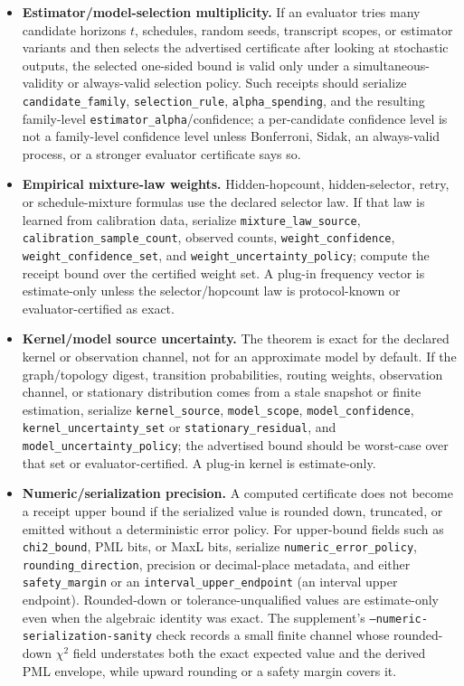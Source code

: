 \documentclass[11pt]{article}
\begin{document}
\begin{itemize}[leftmargin=1.2em]
\item \textbf{Estimator/model-selection multiplicity.} If an evaluator tries many candidate horizons $t$, schedules, random seeds, transcript scopes, or estimator variants and then selects the advertised certificate after looking at stochastic outputs, the selected one-sided bound is valid only under a simultaneous-validity or always-valid selection policy.  Such receipts should serialize \nolinkurl{candidate_family}, \nolinkurl{selection_rule}, \nolinkurl{alpha_spending}, and the resulting family-level \texttt{estimator\_alpha}/confidence; a per-candidate confidence level is not a family-level confidence level unless Bonferroni, Sidak, an always-valid process, or a stronger evaluator certificate says so.
\item \textbf{Empirical mixture-law weights.} Hidden-hopcount, hidden-selector, retry, or schedule-mixture formulas use the declared selector law.  If that law is learned from calibration data, serialize \nolinkurl{mixture_law_source}, \nolinkurl{calibration_sample_count}, observed counts, \nolinkurl{weight_confidence}, \nolinkurl{weight_confidence_set}, and \nolinkurl{weight_uncertainty_policy}; compute the receipt bound over the certified weight set.  A plug-in frequency vector is estimate-only unless the selector/hopcount law is protocol-known or evaluator-certified as exact.
\item \textbf{Kernel/model source uncertainty.} The theorem is exact for the declared kernel or observation channel, not for an approximate model by default.  If the graph/topology digest, transition probabilities, routing weights, observation channel, or stationary distribution comes from a stale snapshot or finite estimation, serialize \nolinkurl{kernel_source}, \nolinkurl{model_scope}, \nolinkurl{model_confidence}, \nolinkurl{kernel_uncertainty_set} or \nolinkurl{stationary_residual}, and \nolinkurl{model_uncertainty_policy}; the advertised bound should be worst-case over that set or evaluator-certified.  A plug-in kernel is estimate-only.
\item \textbf{Numeric/serialization precision.} A computed certificate does not become a receipt upper bound if the serialized value is rounded down, truncated, or emitted without a deterministic error policy.  For upper-bound fields such as \texttt{chi2\_bound}, PML bits, or MaxL bits, serialize \nolinkurl{numeric_error_policy}, \nolinkurl{rounding_direction}, precision or decimal-place metadata, and either \nolinkurl{safety_margin} or an \nolinkurl{interval_upper_endpoint} (an interval upper endpoint).  Rounded-down or tolerance-unqualified values are estimate-only even when the algebraic identity was exact.  The supplement's \texttt{--numeric-serialization-sanity} check records a small finite channel whose rounded-down \(\chi^2\) field understates both the exact expected value and the derived PML envelope, while upward rounding or a safety margin covers it.

\end{itemize}
\end{document}
